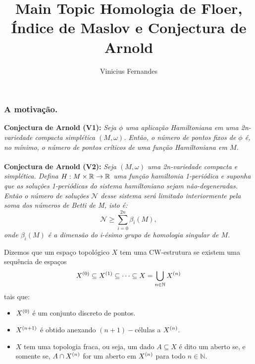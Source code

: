 \documentclass{beamer}
\title[Short title]{Main Topic } %
\author{Vinicius Fernandes}
\title{Homologia de Floer, Índice de Maslov e Conjectura de Arnold}
\institute{Universidade Federal do ABC}
\begin{document}
	
	\begin{frame}
		\titlepage %
	\end{frame}
	
	\begin{frame}
		\frametitle{
			A motivação.}
		\textbf{Conjectura de Arnold (V1):} \textit{Seja $\phi$ uma aplicação Hamiltoniana em uma 2n-variedade compacta simplética $(M, \omega)$. Então, o número de pontos fixos de $\phi$ é, no mínimo, o número de pontos críticos de uma função Hamiltoniana em $M$.}
		\\~\\
		
		\pause	
		\textbf{Conjectura de Arnold (V2):} \textit	{Seja $(M,\omega)$ uma 2n-variedade compacta e simplética. Defina  $H:M\times \mathbb{R}^{} \to \mathbb{R}^{}$  uma função hamiltonia 1-periódica e suponha que as soluções 1-periódicas do sistema hamiltoniano sejam não-degeneradas. Então o número de soluções $\mathcal{N}$ desse sistema será limitado interiormente pela soma dos números de Betti de M, isto é:
			$$
			\mathcal{N}\geq \sum_{i=0}^{2n}\beta_{i}(M),
			$$
			onde $\beta_{i}(M)$ é a dimensão do i-ésimo grupo de homologia singular de $M$.}
	\end{frame}
	
	\begin{frame}
		
		\begin{definicao}[CW-complexo]
			Dizemos que um espaço topológico $X$ tem uma CW-estrutura se existem uma sequência de espaços
			$$
			X^{(0)} \subseteq X^{(1)} \subseteq \dots \subseteq X = \bigcup \limits_{n\in \mathbb{N}} X^{(n)}
			$$ 
			tais que:
			\begin{itemize}
				\item $X^{(0)}$ é um conjunto discreto de pontos.
				
				\item $X^{(n+1)}$ é obtido anexando $(n+1)-$células a $X^{(n)}$.
				
				\item $X$ tem uma topologia fraca, ou seja, um dado $A \subseteq X$ é dito um aberto se, e somente se, $A \cap X^{(n)}$ for um aberto em $X^{(n)}$ para todo $n \in \mathbb{N}$.
			\end{itemize}
		\end{definicao}
	\end{frame}
	
\end{document}
